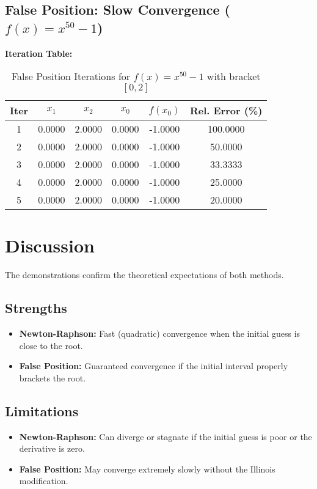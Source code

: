 \documentclass[12pt,a4paper]{article}
\begin{document}
\subsection{False Position: Slow Convergence ($f(x)=x^{50}-1$)}
\vspace{1em}
\noindent\textbf{Iteration Table:}

\begin{table}[H]
\centering
\caption{False Position Iterations for $f(x)=x^{50}-1$ with bracket $[0,2]$}
\begin{tabular}{|c|c|c|c|c|c|}
\hline
Iter & $x_1$ & $x_2$ & $x_0$ & $f(x_0)$ & Rel. Error (\%) \\
\hline
1 & 0.0000 & 2.0000 & 0.0000 & -1.0000 & 100.0000 \\
2 & 0.0000 & 2.0000 & 0.0000 & -1.0000 & 50.0000 \\
3 & 0.0000 & 2.0000 & 0.0000 & -1.0000 & 33.3333 \\
4 & 0.0000 & 2.0000 & 0.0000 & -1.0000 & 25.0000 \\
5 & 0.0000 & 2.0000 & 0.0000 & -1.0000 & 20.0000 \\
\hline
\end{tabular}
\end{table}


\section{Discussion}
The demonstrations confirm the theoretical expectations of both methods.

\subsection{Strengths}
\begin{itemize}
    \item \textbf{Newton-Raphson:} Fast (quadratic) convergence when the initial guess is close to the root.
    \item \textbf{False Position:} Guaranteed convergence if the initial interval properly brackets the root.
\end{itemize}

\subsection{Limitations}
\begin{itemize}
    \item \textbf{Newton-Raphson:} Can diverge or stagnate if the initial guess is poor or the derivative is zero.
    \item \textbf{False Position:} May converge extremely slowly without the Illinois modification.
\end{itemize}
\end{document}
